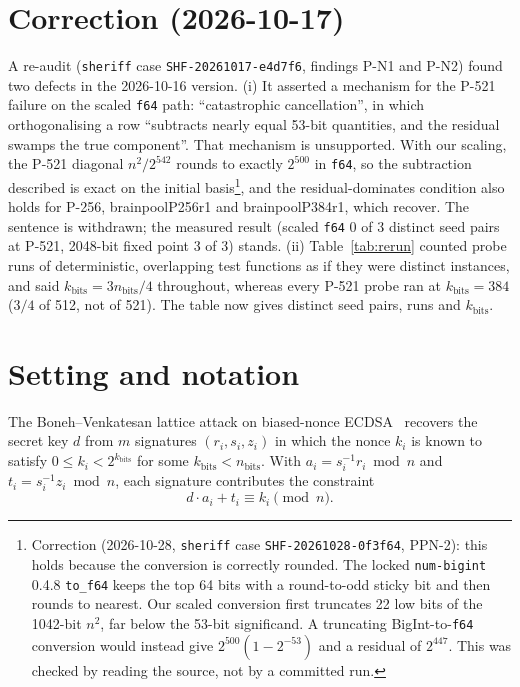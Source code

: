 \documentclass[10pt,a4paper]{article}
\begin{document}
\section*{Correction (2026-10-17)}

A re-audit (\texttt{sheriff} case \texttt{SHF-20261017-e4d7f6},
findings P-N1 and P-N2) found two defects in the 2026-10-16 version.
(i) It asserted a mechanism for the P-521 failure on the scaled
\texttt{f64} path: ``catastrophic cancellation'', in which
orthogonalising a row ``subtracts nearly equal 53-bit quantities, and
the residual swamps the true component''. That mechanism is
unsupported. With our scaling, the P-521 diagonal $n^2/2^{542}$ rounds
to exactly $2^{500}$ in \texttt{f64}, so the subtraction described is
exact on the initial basis\footnote{Correction (2026-10-28,
\texttt{sheriff} case \texttt{SHF-20261028-0f3f64}, PPN-2): this
holds because the conversion is correctly rounded. The locked
\texttt{num-bigint} 0.4.8 \texttt{to\_f64} keeps the top 64 bits with
a round-to-odd sticky bit and then rounds to nearest. Our scaled
conversion first truncates 22 low bits of the 1042-bit $n^2$, far below
the 53-bit significand. A truncating BigInt-to-\texttt{f64}
conversion would instead give $2^{500}(1-2^{-53})$ and a residual of
$2^{447}$. This was checked by reading the source, not by a committed
run.}, and the residual-dominates condition also
holds for P-256, brainpoolP256r1 and brainpoolP384r1, which recover.
The sentence is withdrawn; the measured result (scaled \texttt{f64}
0 of 3 distinct seed pairs at P-521, 2048-bit fixed point 3 of 3)
stands. (ii) Table~\ref{tab:rerun} counted probe runs of deterministic,
overlapping test functions as if they were distinct instances, and
said $k_{\text{bits}} = 3n_{\text{bits}}/4$ throughout, whereas every
P-521 probe ran at $k_{\text{bits}} = 384$ ($3/4$ of 512, not of 521).
The table now gives distinct seed pairs, runs and $k_{\text{bits}}$.

\section{Setting and notation}

The Boneh--Venkatesan lattice attack on biased-nonce
ECDSA~\cite{boneh1996,nguyen2002} recovers the secret key $d$ from
$m$ signatures $(r_i, s_i, z_i)$ in which the nonce $k_i$ is known
to satisfy $0 \leq k_i < 2^{k_{\text{bits}}}$ for some
$k_{\text{bits}} < n_{\text{bits}}$. With $a_i = s_i^{-1} r_i \bmod n$
and $t_i = s_i^{-1} z_i \bmod n$, each signature contributes the
constraint
\[
   d \cdot a_i + t_i \equiv k_i \pmod{n}.
\]
\end{document}
